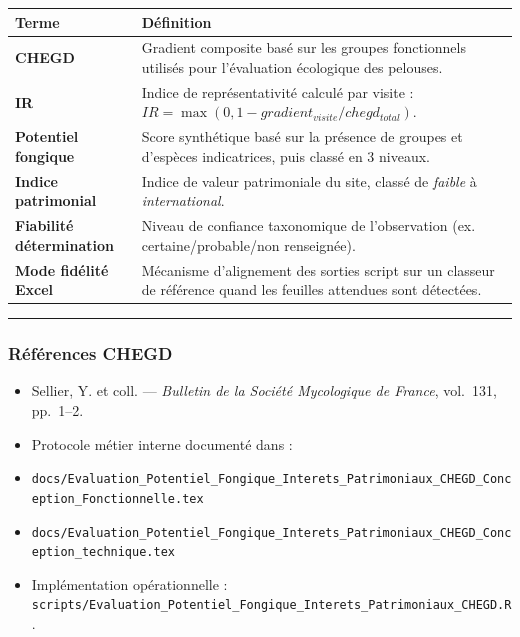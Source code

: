 {\def\LTcaptype{none} %
\begin{longtable}[]{@{}
  >{\raggedright\arraybackslash}p{}
  >{\raggedright\arraybackslash}p{}@{}}
\toprule\noalign{}
\begin{minipage}[b]{\linewidth}\raggedright
Terme
\end{minipage} & \begin{minipage}[b]{\linewidth}\raggedright
Définition
\end{minipage} \\
\midrule\noalign{}
\endhead
\bottomrule\noalign{}
\endlastfoot
\textbf{CHEGD} & Gradient composite basé sur les groupes fonctionnels
utilisés pour l'évaluation écologique des pelouses. \\
\textbf{IR} & Indice de représentativité calculé par visite :
\(IR = \max(0, 1 - gradient_{visite}/chegd_{total})\). \\
\textbf{Potentiel fongique} & Score synthétique basé sur la présence de
groupes et d'espèces indicatrices, puis classé en 3 niveaux. \\
\textbf{Indice patrimonial} & Indice de valeur patrimoniale du site,
classé de \emph{faible} à \emph{international}. \\
\textbf{Fiabilité détermination} & Niveau de confiance taxonomique de
l'observation (ex. certaine/probable/non renseignée). \\
\textbf{Mode fidélité Excel} & Mécanisme d'alignement des sorties script
sur un classeur de référence quand les feuilles attendues sont
détectées. \\
\end{longtable}
}

\begin{center}\rule{0.5\linewidth}{0.5pt}\end{center}

\subsubsection{Références CHEGD}\label{ruxe9fuxe9rences-chegd}

\begin{itemize}
\tightlist
\item
  Sellier, Y. et coll. --- \emph{Bulletin de la Société Mycologique de
  France}, vol.~131, pp.~1--2.
\item
  Protocole métier interne documenté dans :
\item
  \texttt{docs/Evaluation\_Potentiel\_Fongique\_Interets\_Patrimoniaux\_CHEGD\_Conception\_Fonctionnelle.tex}
\item
  \texttt{docs/Evaluation\_Potentiel\_Fongique\_Interets\_Patrimoniaux\_CHEGD\_Conception\_technique.tex}
\item
  Implémentation opérationnelle :
  \texttt{scripts/Evaluation\_Potentiel\_Fongique\_Interets\_Patrimoniaux\_CHEGD.R}.
\end{itemize}

